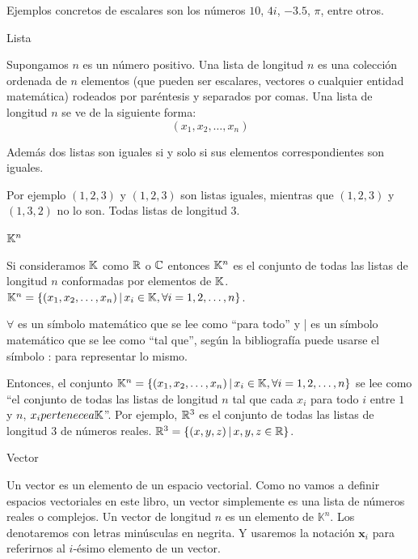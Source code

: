 Ejemplos concretos de escalares son los números $10$, $4i$, $-3.5$, $\pi$, entre otros.

\begin{definition}
    Lista 

    Supongamos $n$ es un número positivo. Una lista de longitud $n$ es una colección ordenada de $n$ elementos 
    (que pueden ser escalares, vectores o cualquier entidad matemática) rodeados por paréntesis y separados por comas.
    Una lista de longitud $n$ se ve de la siguiente forma:
    \begin{equation}
        (x_1, x_2, \ldots, x_n)
    \end{equation}

    Además dos listas son iguales si y solo si sus elementos correspondientes son iguales.
\end{definition}

Por ejemplo $(1, 2, 3)$ y $(1, 2, 3)$ son listas iguales, mientras que $(1, 2, 3)$ y $(1, 3, 2)$ no lo son. Todas listas de longitud 3.

\begin{definition}
    $\mathbb{K}^n$
    
    Si consideramos $\mathbb{K}$ como $\mathbb{R}$ o $\mathbb{C}$ entonces $\mathbb{K}^n$ es el conjunto de todas las listas de longitud $n$ conformadas por elementos de $\mathbb{K}$.
    $ \mathbb{K}^n = \{(x_1, x_2, \ldots, x_n) \,|\, x_i \in \mathbb{K}, \forall i = 1, 2, \ldots, n\}$.
\end{definition}

$\forall $ es un símbolo matemático que se lee como ``para todo'' y | es un símbolo matemático que se lee como ``tal que'', según la bibliografía puede usarse el símbolo : para representar lo mismo.

Entonces, el conjunto $ \mathbb{K}^n = \{(x_1, x_2, \ldots, x_n) \,|\, x_i \in \mathbb{K}, \forall i = 1, 2, \ldots, n\}$
se lee como ``el conjunto de todas las listas de longitud $n$ tal que cada $x_i$ para todo $i$ entre $1$ y $n$, $x_i pertenece a \mathbb{K}$''.
Por ejemplo, $\mathbb{R}^3$ es el conjunto de todas las listas de longitud 3 de números reales. $\mathbb{R}^3 = \{(x, y, z) \,|\, x, y, z \in \mathbb{R}\}$.

\begin{definition}
    Vector
    
    Un vector es un elemento de un espacio vectorial. Como no vamos a definir espacios vectoriales en este libro, un vector simplemente es una lista de números reales o complejos. Un vector de longitud $n$ es un elemento de $\mathbb{K}^n$. Los denotaremos con letras minúsculas en negrita. Y usaremos la notación $\mathbf{x}_i$ para referirnos al $i$-ésimo elemento de un vector.
\end{definition}

